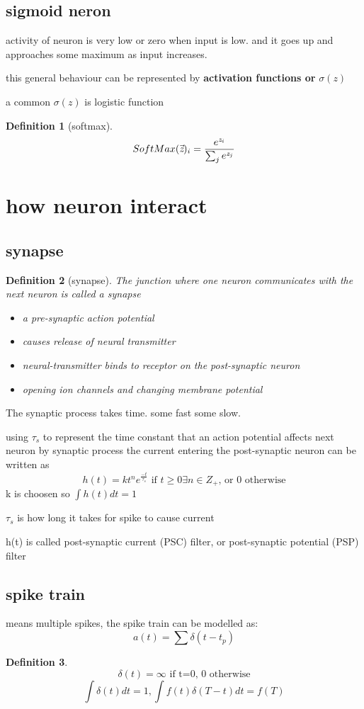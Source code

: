 \documentclass[10pt]{article}
\theoremstyle{break}
\newtheorem{defn}{Definition}[subsection]
\begin{document}
\subsection{sigmoid neron}
activity of neuron is very low or zero when input is low. and it goes up and approaches some maximum as input increases. 

this general behaviour can be represented by \textbf{activation functions or }$\sigma(z)$

a common $\sigma(z)$ is logistic function

\begin{defn}[softmax]
    $$SoftMax(\vec{\emph{z}})_i=\frac{e^{\emph{z}_i}}{\sum_je^{\emph{z}_j}}$$
\end{defn}

\section{how neuron interact}
\subsection{synapse}
\begin{defn}[synapse]
    The junction where one neuron communicates with the next neuron is called a synapse
    \begin{itemize}
        \item a pre-synaptic action potential 
        \item causes release of neural transmitter 
        \item neural-transmitter binds to receptor on the post-synaptic neuron
        \item opening ion channels and changing membrane potential
    \end{itemize}
\end{defn}

The synaptic process takes time. some fast some slow.

using $\tau_s$ to represent the time constant that an action potential affects next neuron by synaptic process
the current entering the post-synaptic neuron can be written as 
$$h(t)=kt^ne^{\frac{-t}{\tau_s}}\text{ if }t\geq 0 \exists n\in Z_+\text{, or 0 otherwise}$$
k is choosen so
$\int h(t)dt =1$ 

$\tau_s$ is how long it takes for spike to cause current

h(t) is called post-synaptic current (PSC) filter, or post-synaptic potential (PSP) filter
\subsection{spike train}
means multiple spikes, the spike train can be modelled as:
$$a(t)=\sum\delta(t-t_p)$$
\begin{defn}
    $$\delta(t)=\infty \text{ if t=0, 0 otherwise}$$
    $$\int\delta(t)dt=1, \int f(t)\delta(T-t)dt=f(T)$$
\end{defn}
\end{document}
